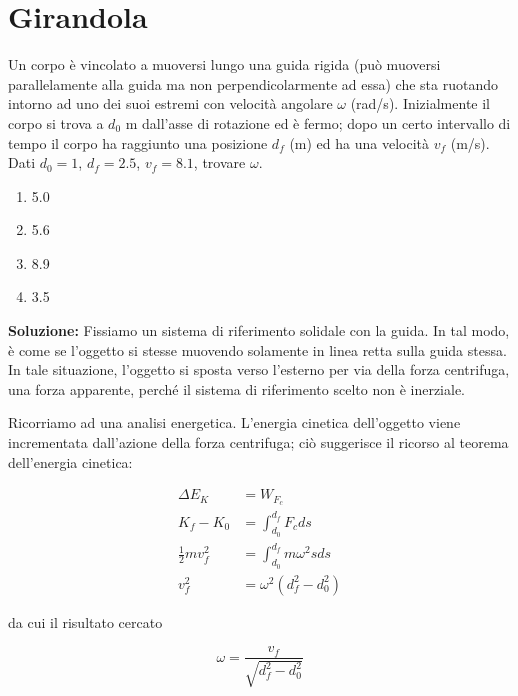 
\section{Girandola}

Un corpo è vincolato a muoversi lungo una guida
rigida (può muoversi parallelamente alla guida
ma non perpendicolarmente ad essa) che sta
ruotando intorno ad uno dei suoi estremi con
velocità angolare $\omega$ (rad/s). Inizialmente
il corpo si trova a $d_0$ m dall'asse di rotazione
ed è fermo; dopo un certo intervallo di tempo
il corpo ha raggiunto una posizione $d_f$ (m)
ed ha una velocità $v_f$ (m/s). Dati
$d_0 = 1$, $d_f = 2.5$, $v_f = 8.1$, trovare
$\omega$.
\begin{enumerate}
    \item 5.0
    \item 5.6
    \item 8.9
    \item 3.5
\end{enumerate}

\noindent \textbf{Soluzione:} Fissiamo un sistema di riferimento
solidale con la guida. In tal modo, è come se
l'oggetto si stesse muovendo solamente in linea
retta sulla guida stessa. In tale situazione,
l'oggetto si sposta verso l'esterno per via
della forza centrifuga, una forza apparente,
perché il sistema di riferimento scelto
non è inerziale.

Ricorriamo ad una analisi energetica. L'energia
cinetica dell'oggetto viene incrementata dall'azione
della forza centrifuga; ciò suggerisce il ricorso
al teorema dell'energia cinetica:

\begin{align}
    \Delta E_K &= W_{F_c}\label{g1}\\
    K_f - K_0 &= \int_{d_0}^{d_f}F_c ds\label{g2}\\
    \frac12 m v_f^2 &= \int_{d_0}^{d_f}m\omega^2sds\label{g3}\\
    v_f^2 &= \omega^2(d_f^2 - d_0^2)\label{g4}
\end{align}

\noindent da cui il risultato cercato

\[ \omega = \frac{v_f}{\sqrt{d_f^2 - d_0^2}} \]


